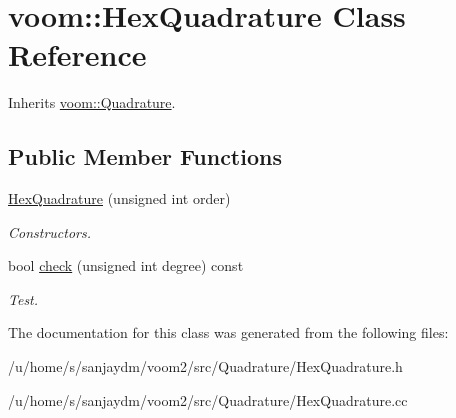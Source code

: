 \hypertarget{classvoom_1_1_hex_quadrature}{
\section{voom::HexQuadrature Class Reference}
\label{classvoom_1_1_hex_quadrature}
}


Inherits \hyperlink{classvoom_1_1_quadrature}{voom::Quadrature}.\subsection*{Public Member Functions}
\begin{DoxyCompactItemize}
\item 
\hypertarget{classvoom_1_1_hex_quadrature_a0585fe7f1af2186daff6bbde8aa6df69}{
\hyperlink{classvoom_1_1_hex_quadrature_a0585fe7f1af2186daff6bbde8aa6df69}{HexQuadrature} (unsigned int order)}
\label{classvoom_1_1_hex_quadrature_a0585fe7f1af2186daff6bbde8aa6df69}

\begin{DoxyCompactList}\small\item\em Constructors. \item\end{DoxyCompactList}\item 
\hypertarget{classvoom_1_1_hex_quadrature_a981bb4b1fa414c34bab3adf12734687a}{
bool \hyperlink{classvoom_1_1_hex_quadrature_a981bb4b1fa414c34bab3adf12734687a}{check} (unsigned int degree) const }
\label{classvoom_1_1_hex_quadrature_a981bb4b1fa414c34bab3adf12734687a}

\begin{DoxyCompactList}\small\item\em Test. \item\end{DoxyCompactList}\end{DoxyCompactItemize}


The documentation for this class was generated from the following files:\begin{DoxyCompactItemize}
\item 
/u/home/s/sanjaydm/voom2/src/Quadrature/HexQuadrature.h\item 
/u/home/s/sanjaydm/voom2/src/Quadrature/HexQuadrature.cc\end{DoxyCompactItemize}

